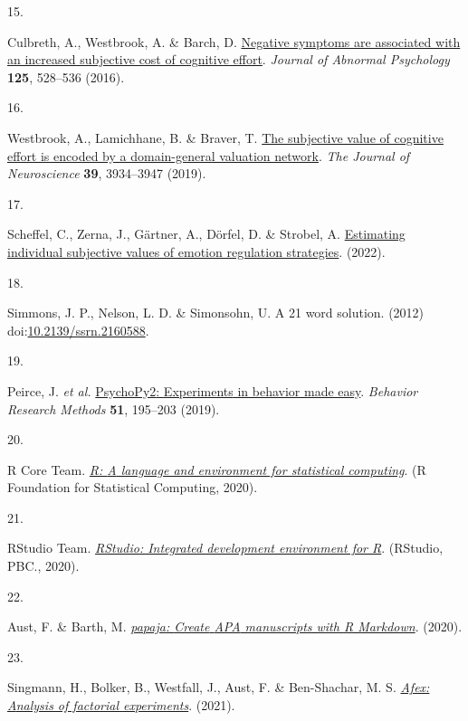 \documentclass[
  man,floatsintext]{apa6}
\newlength{\cslhangindent}
\newlength{\csllabelwidth}
\newlength{\cslentryspacingunit} %
\newenvironment{CSLReferences}[2] %
 {%
  \setlength{\parindent}{0pt}
  \ifodd #1
  \let\oldpar\par
  \def\par{\hangindent=\cslhangindent\oldpar}
  \fi
  \setlength{\parskip}{#2\cslentryspacingunit}
 }%
 {}
\newcommand{\CSLLeftMargin}[1]{\parbox[t]{\csllabelwidth}{#1}}
\newcommand{\CSLRightInline}[1]{\parbox[t]{\linewidth - \csllabelwidth}{#1}\break}
\begin{document}
\begin{CSLReferences}{0}{0}
\leavevmode{}%
\CSLLeftMargin{15. }%
\CSLRightInline{Culbreth, A., Westbrook, A. \& Barch, D. \href{https://doi.org/10.1037/abn0000153}{Negative symptoms are associated with an increased subjective cost of cognitive effort}. \emph{Journal of Abnormal Psychology} \textbf{125}, 528--536 (2016).}

\leavevmode{}%
\CSLLeftMargin{16. }%
\CSLRightInline{Westbrook, A., Lamichhane, B. \& Braver, T. \href{https://doi.org/10.1523/jneurosci.3071-18.2019}{The subjective value of cognitive effort is encoded by a domain-general valuation network}. \emph{The Journal of Neuroscience} \textbf{39}, 3934--3947 (2019).}

\leavevmode{}%
\CSLLeftMargin{17. }%
\CSLRightInline{Scheffel, C., Zerna, J., Gärtner, A., Dörfel, D. \& Strobel, A. \href{https://psyarxiv.com/wr8qx}{Estimating individual subjective values of emotion regulation strategies}. (2022).}

\leavevmode{}%
\CSLLeftMargin{18. }%
\CSLRightInline{Simmons, J. P., Nelson, L. D. \& Simonsohn, U. A 21 word solution. (2012) doi:\href{https://doi.org/10.2139/ssrn.2160588}{10.2139/ssrn.2160588}.}

\leavevmode{}%
\CSLLeftMargin{19. }%
\CSLRightInline{Peirce, J. \emph{et al.} \href{https://doi.org/10.3758/s13428-018-01193-y}{{PsychoPy2}: {Experiments} in behavior made easy}. \emph{Behavior Research Methods} \textbf{51}, 195--203 (2019).}

\leavevmode{}%
\CSLLeftMargin{20. }%
\CSLRightInline{R Core Team. \emph{\href{https://www.R-project.org/}{R: {A} language and environment for statistical computing}}. (R Foundation for Statistical Computing, 2020).}

\leavevmode{}%
\CSLLeftMargin{21. }%
\CSLRightInline{RStudio Team. \emph{\href{http://www.rstudio.com/}{{RStudio: Integrated development environment for R}}}. (RStudio, PBC., 2020).}

\leavevmode{}%
\CSLLeftMargin{22. }%
\CSLRightInline{Aust, F. \& Barth, M. \emph{\href{https://github.com/crsh/papaja}{{papaja}: {Create} {APA} manuscripts with {R Markdown}}}. (2020).}

\leavevmode{}%
\CSLLeftMargin{23. }%
\CSLRightInline{Singmann, H., Bolker, B., Westfall, J., Aust, F. \& Ben-Shachar, M. S. \emph{\href{https://CRAN.R-project.org/package=afex}{Afex: {A}nalysis of factorial experiments}}. (2021).}


\end{CSLReferences}
\end{document}
